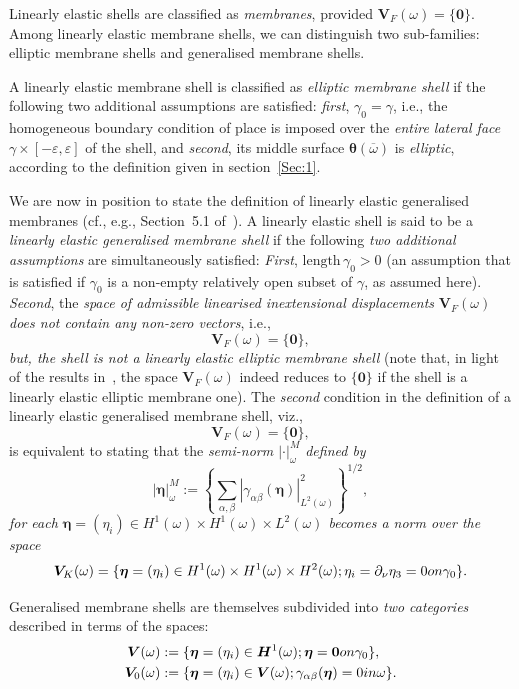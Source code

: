 \documentclass{amsart}
\begin{document}
Linearly elastic shells are classified as \emph{membranes}, provided $\bm{V}_F(\omega)=\{\bm{0}\}$. Among linearly elastic membrane shells, we can distinguish two sub-families: elliptic membrane shells and generalised membrane shells.

A linearly elastic membrane shell is classified as \emph{elliptic membrane shell} if the following two additional assumptions are satisfied: \emph{first}, $\gamma_0 = \gamma$, i.e., the homogeneous boundary condition of place is imposed over the \emph{entire lateral face} $\gamma \times \left[-\varepsilon,\varepsilon\right]$ of the shell, and \emph{second}, its middle surface $\bm{\theta}(\overline{\omega})$ is \emph{elliptic}, according to the definition given in section~\ref{Sec:1}.

We are now in position to state the definition of linearly elastic generalised membranes (cf., e.g., Section~5.1 of~\cite{Ciarlet2000}). A linearly elastic shell is said to be a \emph{linearly elastic generalised membrane shell} if the following \emph{two additional assumptions} are simultaneously satisfied: \emph{First}, $\text{length}\,\gamma_0>0$ (an assumption that is satisfied if $\gamma_0$ is a non-empty relatively open subset of $\gamma$, as assumed here). \emph{Second}, the \emph{space of admissible linearised inextensional displacements} $\bm{V}_F(\omega)$ \emph{does not contain any non-zero vectors}, i.e.,
$$
\bm{V}_F(\omega) = \{\bm{0}\},
$$
\emph{but, the shell is not a linearly elastic elliptic membrane shell} (note that, in light of the results in~\cite{Ciarlet2000}, the space $\bm{V}_F(\omega)$ indeed reduces to $\{\bm{0}\}$ if the shell is a linearly elastic elliptic membrane one).
The \emph{second} condition in the definition of a linearly elastic generalised membrane shell, viz.,
$$
\bm{V}_F(\omega)=\{\bm{0}\},
$$
is equivalent to stating that the \emph{semi-norm $\left|\cdot\right|_\omega^M$ defined by
	$$
	|\bm{\eta}|_\omega^M:=\left\{\sum_{\alpha,\beta}|\gamma_{\alpha\beta}(\bm{\eta})|_{L^2(\omega)}^2\right\}^{1/2},
	$$
	for each $\bm{\eta}=(\eta_i) \in H^1(\omega) \times H^1(\omega) \times L^2(\omega)$ becomes a norm over the space} 
$$
\bm{V}_K(\omega)=\{\bm{\eta}=(\eta_i) \in H^1(\omega)\times H^1(\omega) \times H^2(\omega); \eta_i=\partial_{\nu}\eta_3=0 \textup{ on }\gamma_0\}.
$$

Generalised membrane shells are themselves subdivided into \emph{two categories} described in terms of the spaces:
\begin{align*}
	\bm{V}(\omega)&:=\{\bm{\eta}=(\eta_i) \in \bm{H}^1(\omega);\bm{\eta}={\bm{0}} \textup{ on }\gamma_0\},\\
	\bm{V}_{0}(\omega)&:=\{\bm{\eta}=(\eta_i)\in\bm{V}(\omega);\gamma_{\alpha\beta}(\bm{\eta})=0 \textup{ in }\omega\}.
\end{align*}
\end{document}
